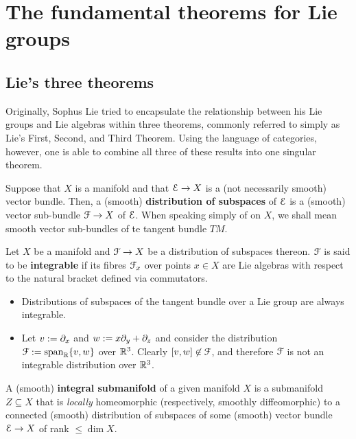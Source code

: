 \section{The fundamental theorems for Lie groups}
    \subsection{Lie's three theorems}
        Originally, Sophus Lie tried to encapsulate the relationship between his Lie groups and Lie algebras within three theorems, commonly referred to simply as Lie's First, Second, and Third Theorem. Using the language of categories, however, one is able to combine all three of these results into one singular theorem.
        
        \begin{definition} \label{def: distributionsof_subspaces_on_manifolds}
            Suppose that $X$ is a manifold and that $\mathcal{E} \to X$ is a (not necessarily smooth) vector bundle. Then, a (smooth) \textbf{distribution of subspaces} of $\mathcal{E}$ is a (smooth) vector sub-bundle $\mathcal{F} \to X$ of $\mathcal{E}$. When speaking simply of  on $X$, we shall mean smooth vector sub-bundles of te tangent bundle $TM$.
        \end{definition}
        \begin{definition} \label{def: integrability_of_distributions}
            Let $X$ be a manifold and $\mathcal{F} \to X$ be a distribution 
            of subspaces thereon. $\mathcal{F}$ is said to be \textbf{integrable} if its fibres $\mathcal{F}_x$ over points $x \in X$ are Lie algebras with respect to the natural bracket defined via commutators.
        \end{definition}
        \begin{example}
            \noindent
            \begin{itemize}
                \item Distributions of subspaces of the tangent bundle over a Lie group are always integrable.
                \item Let $v := \partial_x$ and $w := x\partial_y + \partial_z$ and consider the distribution $\mathcal{F} := \operatorname{span}_{\mathbb{R}}\{v, w\}$ over $\mathbb{R}^3$. Clearly $[v, w] \not \in \mathcal{F}$, and therefore $\mathcal{F}$ is not an integrable distribution over $\mathbb{R}^3$.
            \end{itemize}
        \end{example}
        \begin{definition} \label{def: integral_submanifolds}
            A (smooth) \textbf{integral submanifold} of a given manifold $X$ is a submanifold $Z \subseteq X$ that is \textit{locally} homeomorphic (respectively, smoothly diffeomorphic) to a connected (smooth) distribution of subspaces of some (smooth) vector bundle $\mathcal{E} \to X$ of rank $\leq \dim X$.
        \end{definition}
